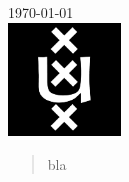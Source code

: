 \documentclass[a4paper,10pt]{report}
\begin{document}
\begin{titlepage}


{\large \today}\\[3cm] %


\includegraphics[width=30mm]{Logo}\\[1cm] %
 

\vfill %

\end{titlepage}

\begin{abstract}
    bla
\end{abstract}

\tableofcontents

















\end{document}
